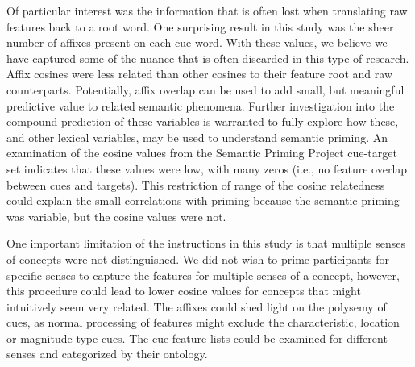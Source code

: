 \documentclass[english,,man]{apa6}
\begin{document}
Of particular interest was the information that is often lost when translating raw features back to a root word. One surprising result in this study was the sheer number of affixes present on each cue word. With these values, we believe we have captured some of the nuance that is often discarded in this type of research. Affix cosines were less related than other cosines to their feature root and raw counterparts. Potentially, affix overlap can be used to add small, but meaningful predictive value to related semantic phenomena. Further investigation into the compound prediction of these variables is warranted to fully explore how these, and other lexical variables, may be used to understand semantic priming. An examination of the cosine values from the Semantic Priming Project cue-target set indicates that these values were low, with many zeros (i.e., no feature overlap between cues and targets). This restriction of range of the cosine relatedness could explain the small correlations with priming because the semantic priming was variable, but the cosine values were not.

One important limitation of the instructions in this study is that multiple senses of concepts were not distinguished. We did not wish to prime participants for specific senses to capture the features for multiple senses of a concept, however, this procedure could lead to lower cosine values for concepts that might intuitively seem very related. The affixes could shed light on the polysemy of cues, as normal processing of features might exclude the characteristic, location or magnitude type cues. The cue-feature lists could be examined for different senses and categorized by their ontology.
\end{document}
